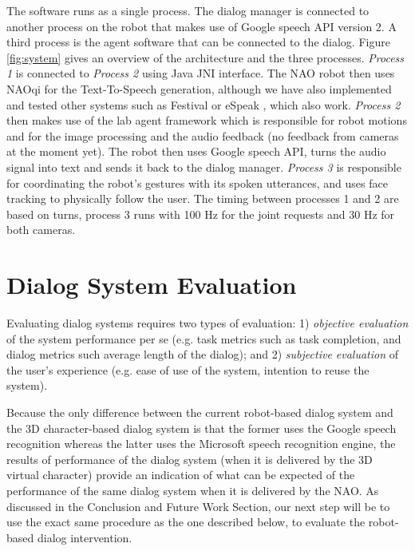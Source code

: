 \documentclass[letterpaper]{article}
\begin{document}
The software runs as a single process. The
dialog manager is connected to another process on the robot that makes use of Google speech API 
version 2. 
A third process is 
the agent software that can be connected to the dialog. Figure \ref{fig:system} gives an 
overview of the architecture and the three processes. {\em Process 1} is connected to {\em Process 2} using 
Java JNI interface.  The NAO robot then uses NAOqi for the Text-To-Speech 
generation, although we have also implemented and tested other systems such as Festival 
\cite{taylor1998architecture} or eSpeak \cite{eSpeak}, which  also work. {\em Process 2} then makes 
use of the lab agent framework which is responsible for robot motions and 
for the image processing and the audio feedback (no feedback from cameras at the moment yet). The 
robot then uses Google speech API, turns the audio signal into text and sends it back to the dialog 
manager. {\em Process 3} is responsible for coordinating the robot's gestures with its spoken utterances, and uses face tracking to physically follow the user.  The timing between processes 1 and 2 are based on turns, process 3 runs with 100 Hz for the 
joint requests and 30 Hz for both cameras.

\section*{Dialog System Evaluation}

Evaluating dialog systems requires two types of evaluation: 1) {\em objective evaluation} of the system performance per se (e.g. task metrics such as task completion, and dialog metrics such average length of the dialog); and 2) {\em subjective evaluation} of the user's experience (e.g. ease of use of the system, intention to reuse the system).

Because the only difference between the current robot-based dialog system and the 3D character-based dialog system \cite{YASCLL14} is that the former uses the Google speech recognition whereas the latter uses the Microsoft speech recognition engine, the results of performance of the dialog system (when it is delivered by the 3D virtual character) provide an indication of what can be expected of the performance of the same dialog system when it is delivered by the NAO.  As discussed in the Conclusion and Future Work Section, our next step will be to use the exact same procedure as the one described below, to evaluate the robot-based dialog intervention.
\end{document}
